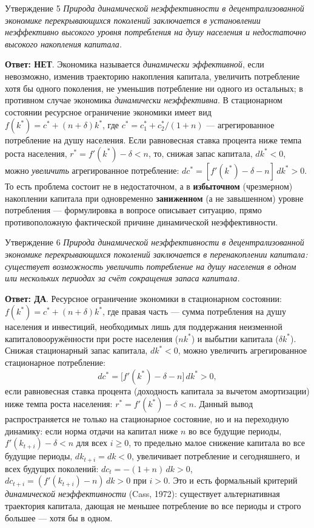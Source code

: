 \documentclass[10pt,a4paper]{article}
\newcommand{\qda}{\textbf{\color{yesgreen}Ответ: ДА}}
\newcommand{\qnet}{\textbf{\color{nored}Ответ: НЕТ}}
\newenvironment{answer}[2]{%
  \begin{qbox}{Утверждение #1}
  \textit{#2}\par\smallskip
}{%
  \end{qbox}\vspace{2pt}
}
\begin{document}
\begin{answer}{5}{Природа динамической неэффективности в децентрализованной экономике перекрывающихся поколений заключается в установлении неэффективно высокого уровня потребления на душу населения и недостаточно высокого накопления капитала.}
\qnet. Экономика называется \emph{динамически эффективной}, если невозможно, изменив траекторию накопления капитала, увеличить потребление хотя бы одного поколения, не уменьшив потребление ни одного из остальных; в противном случае экономика \emph{динамически неэффективна}. В стационарном состоянии ресурсное ограничение экономики имеет вид $f(k^{*})=c^{*}+(n+\delta)k^{*}$, где $c^{*}=c_1^{*}+c_2^{*}/(1+n)$ — агрегированное потребление на душу населения. Если равновесная ставка процента ниже темпа роста населения, $r^{*}=f'(k^{*})-\delta<n$, то, снижая запас капитала, $dk^{*}<0$, можно \emph{увеличить} агрегированное потребление: $dc^{*}=[f'(k^{*})-\delta-n]\,dk^{*}>0$. То есть проблема состоит не в недостаточном, а в \textbf{избыточном} (чрезмерном) накоплении капитала при одновременно \textbf{заниженном} (а не завышенном) уровне потребления — формулировка в вопросе описывает ситуацию, прямо противоположную фактической причине динамической неэффективности.
\end{answer}
 
\begin{answer}{6}{Природа динамической неэффективности в децентрализованной экономике перекрывающихся поколений заключается в перенакоплении капитала: существует возможность увеличить потребление на душу населения в одном или нескольких периодах за счёт сокращения запаса капитала.}
\qda. Ресурсное ограничение экономики в стационарном состоянии: $f(k^{*})=c^{*}+(n+\delta)k^{*}$, где правая часть — сумма потребления на душу населения и инвестиций, необходимых лишь для поддержания неизменной капиталовооружённости при росте населения ($nk^{*}$) и выбытии капитала ($\delta k^{*}$). Снижая стационарный запас капитала, $dk^{*}<0$, можно увеличить агрегированное стационарное потребление:
\[
dc^{*} = \bigl[f'(k^{*})-\delta-n\bigr]\,dk^{*} > 0,
\]
если равновесная ставка процента (доходность капитала за вычетом амортизации) ниже темпа роста населения: $r^{*}=f'(k^{*})-\delta<n$. Данный вывод распространяется не только на стационарное состояние, но и на переходную динамику: если норма отдачи на капитал ниже $n$ во все будущие периоды, $f'(k_{t+i})-\delta<n$ для всех $i\ge 0$, то предельно малое снижение капитала во все будущие периоды, $dk_{t+i}=dk<0$, увеличивает потребление и сегодняшнего, и всех будущих поколений: $dc_t=-(1+n)\,dk>0$, $dc_{t+i}=(f'(k_{t+i})-n)\,dk>0$ при $i>0$. Это и есть формальный критерий \emph{динамической неэффективности} (Cass, 1972): существует альтернативная траектория капитала, дающая не меньшее потребление во все периоды и строго большее — хотя бы в одном.
\end{answer}
 
\end{document}
